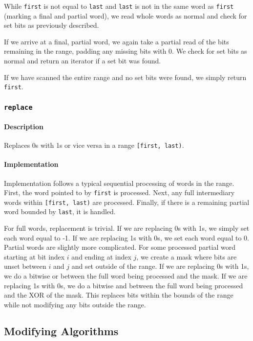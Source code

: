 \documentclass[letterpaper, 8pt, twocolumn]{article}
\begin{document}
While \texttt{first} is not equal to \texttt{last} and \texttt{last} is not in the same word as \texttt{first} (marking a final and partial word), we read whole words as normal and check for set bits as previously described.

If we arrive at a final, partial word, we again take a partial read of the bits remaining in the range, padding any missing bits with 0. We check for set bits as normal and return an iterator if a set bit was found.

If we have scanned the entire range and no set bits were found, we simply return \texttt{first}.

\subsubsection{\texttt{replace}}
\paragraph{Description}
Replaces 0s with 1s or vice versa in a range \texttt{[first, last)}.

\paragraph{Implementation}
Implementation follows a typical sequential processing of words in the range. First, the word pointed to by \texttt{first} is processed. Next, any full intermediary words within \texttt{[first, last)} are processed. Finally, if there is a remaining partial word bounded by \texttt{last}, it is handled.

For full words, replacement is trivial. If we are replacing 0s with 1s, we simply set each word equal to -1. If we are replacing 1s with 0s, we set each word equal to 0. Partial words are slightly more complicated. For some processed partial word starting at bit index $i$ and ending at index $j$, we create a mask where bits are unset between $i$ and $j$ and set outside of the range. If we are replacing 0s with 1s, we do a bitwise or between the full word being processed and the mask. If we are replacing 1s with 0s, we do a bitwise and between the full word being processed and the XOR of the mask. This replaces bits within the bounds of the range while not modifying any bits outside the range.


\subsection{Modifying Algorithms}
\label{subsec:modifyingAlgs}
\end{document}
